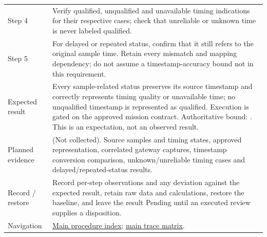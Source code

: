 \begin{tabularx}{\linewidth}{L{3.2cm}Y}
Step 4 & Verify qualified, unqualified and unavailable timing indications for their respective cases; check that unreliable or unknown time is never labeled qualified.\\
Step 5 & For delayed or repeated status, confirm that it still refers to the original sample time. Retain every mismatch and mapping dependency; do not assume a timestamp-accuracy bound not in this requirement.\\
Expected result & Every sample-related status preserves its source timestamp and correctly represents timing quality or unavailable time; no unqualified timestamp is represented as qualified. Execution is gated on the approved mission contract. Authoritative bound: . This is an expectation, not an observed result.\\
Planned evidence &  (Not collected). Source samples and timing states, approved representation, correlated gateway captures, timestamp conversion comparison, unknown/unreliable timing cases and delayed/repeated-status results.\\
Record / restore & Record per-step observations and any deviation against the expected result, retain raw data and calculations, restore the baseline, and leave the result Pending until an executed review supplies a disposition.\\
Navigation & \hyperref[Table:WeekTwoTests]{Main procedure index}; \hyperref[Table:TraceabilityMatrix]{main trace matrix}.\\
\end{tabularx}
\normalsize
